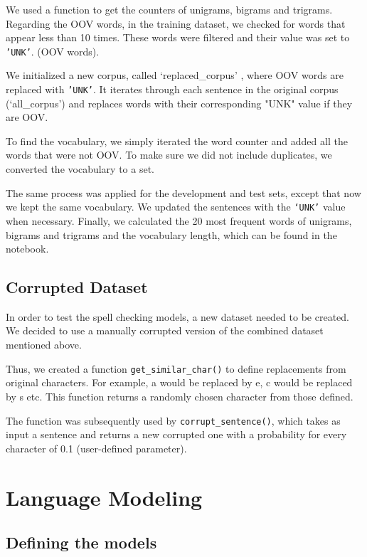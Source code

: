 \documentclass[11pt, a4paper]{article}
\begin{document}
	
	We used a function to get the counters of unigrams, bigrams and trigrams.  Regarding the OOV words, in the training dataset, we checked for words that appear less than 10 times. These words were filtered and their value was set to \texttt{'UNK'}. (OOV words).
	
	We initialized a new corpus, called ‘replaced\_corpus’ , where  OOV words are replaced with \texttt{'UNK'}. It iterates through each sentence in the original corpus (‘all\_corpus’) and replaces words with their corresponding "UNK" value if they are OOV.
	
	To find the vocabulary, we simply iterated the word counter and added all the words that were not OOV. To make sure we did not include duplicates, we converted the vocabulary to a set.
	
	The same process was applied for the development and test sets, except that now we kept the same vocabulary. We updated the sentences with the \texttt{‘UNK’} value when necessary. Finally, we calculated the 20 most frequent words of unigrams, bigrams and trigrams and the vocabulary length, which can be found in the notebook.
	
	
	\subsection{Corrupted Dataset}
	
	In order to test the spell checking models, a new dataset needed to be created. We decided to use a manually corrupted version of the combined dataset mentioned above.
	
	Thus, we created a function \texttt{get\_similar\_char()} to define replacements from original characters. For example, a would be replaced by e, c would be replaced by s etc. This function returns a randomly chosen character from those defined.
	
	The function was subsequently used by \texttt{corrupt\_sentence()}, which takes as input a sentence and returns a new corrupted one with a probability for every character of 0.1 (user-defined parameter). 
	
	
	\section{Language Modeling}
	
	\subsection{Defining the models}
	
\end{document}
